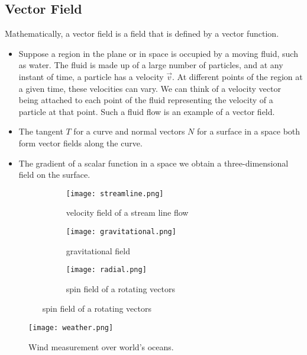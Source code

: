 \documentclass[aima331_lecturenotes_ku.tex]{subfiles}
\begin{document}
\subsection{Vector Field}
Mathematically, a vector field is a field that is defined by a vector function.
\begin{itemize}
\item Suppose a region in the plane or in space is occupied by a moving fluid, such as water. The fluid is made up of a large number of particles, and at any instant of time, a particle has a velocity $\vec{v}$. At different points of the region at a given time, these velocities can vary. We can think of a velocity vector being attached to each point of the fluid representing the velocity of a particle at that point. Such a fluid flow is an example of a vector field.

\item The tangent $T$ for a curve and normal vectors $N$ for a surface in a space both form vector fields along the curve.

\item The gradient of a scalar function in a space we obtain a three-dimensional field on the surface.
  \begin{figure}[h]
     \label{streamline}
\centering
\begin{subfigure}{0.32\textwidth}
  \label{streamline}
  \texttt{[image: streamline.png]}
  \caption{velocity field of a stream line flow}
\end{subfigure}
\hfill
\begin{subfigure}{0.31\textwidth}
  \texttt{[image: gravitational.png]}
  \caption{gravitational field}
\end{subfigure}
\hfill
\begin{subfigure}{0.32\textwidth}
  \texttt{[image: radial.png]}
  \caption{spin field of a rotating vectors}
\end{subfigure}
\end{figure}
\end{itemize}

\begin{figure}[h]
  \centering
  \texttt{[image: weather.png]}
  \caption{Wind measurement over world's oceans.}
  \label{weather}
\end{figure}
\end{document}
